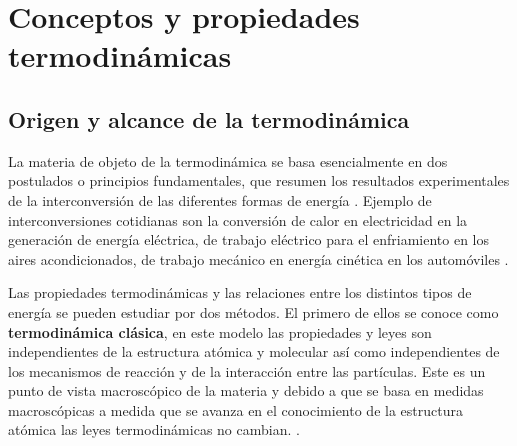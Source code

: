 \documentclass[master.tex]{subfiles}
\begin{document}
    \section{Conceptos y propiedades termodinámicas}

    \subsection{Origen y alcance de la termodinámica}

    La materia de objeto de la termodinámica se basa esencialmente en dos postulados o principios fundamentales, que resumen los resultados experimentales de la interconversión de las diferentes formas de energía \parencite{glasstone}. Ejemplo de interconversiones cotidianas son la conversión de calor en electricidad en la generación de energía eléctrica, de trabajo eléctrico para el enfriamiento en los aires acondicionados, de trabajo mecánico en energía cinética en los automóviles \parencite{faires}.

    Las propiedades termodinámicas y las relaciones entre los distintos tipos de energía se pueden estudiar por dos métodos. El primero de ellos se conoce como \textbf{termodinámica clásica}, en este modelo las propiedades y leyes son independientes de la estructura atómica y molecular así como independientes de los mecanismos de reacción y de la interacción entre las partículas. Este es un punto de vista macroscópico de la materia y debido a que se basa en medidas macroscópicas a medida que se avanza en el conocimiento de la estructura atómica las leyes termodinámicas no cambian. \parencites{faires}{glasstone}{wark}.
\end{document}
